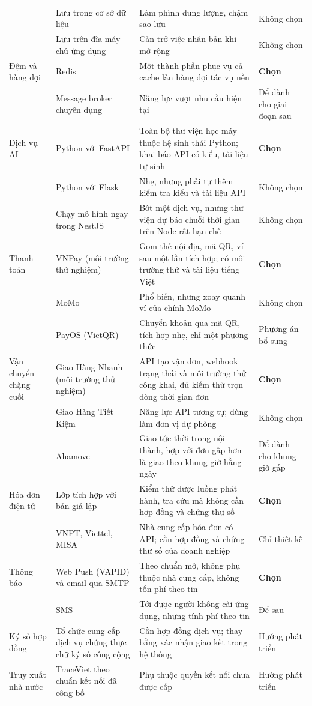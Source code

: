 \begin{longtable}{L{2.60cm} L{3.53cm} L{4.36cm} L{4.05cm}}
& Lưu trong cơ sở dữ liệu & Làm phình dung lượng, chậm sao lưu & Không chọn \\
& Lưu trên đĩa máy chủ ứng dụng & Cản trở việc nhân bản khi mở rộng & Không chọn \\
Đệm và hàng đợi & Redis & Một thành phần phục vụ cả cache lẫn hàng đợi tác vụ nền & \textbf{Chọn} \\
& Message broker chuyên dụng & Năng lực vượt nhu cầu hiện tại & Để dành cho giai đoạn sau \\
Dịch vụ AI & Python với FastAPI & Toàn bộ thư viện học máy thuộc hệ sinh thái Python; khai báo API có kiểu, tài liệu tự sinh & \textbf{Chọn} \\
& Python với Flask & Nhẹ, nhưng phải tự thêm kiểm tra kiểu và tài liệu API & Không chọn \\
& Chạy mô hình ngay trong NestJS & Bớt một dịch vụ, nhưng thư viện dự báo chuỗi thời gian trên Node rất hạn chế & Không chọn \\
Thanh toán & VNPay (môi trường thử nghiệm) & Gom thẻ nội địa, mã QR, ví sau một lần tích hợp; có môi trường thử và tài liệu tiếng Việt & \textbf{Chọn} \\
& MoMo & Phổ biến, nhưng xoay quanh ví của chính MoMo & Không chọn \\
& PayOS (VietQR) & Chuyển khoản qua mã QR, tích hợp nhẹ, chỉ một phương thức & Phương án bổ sung \\
Vận chuyển chặng cuối & Giao Hàng Nhanh (môi trường thử nghiệm) & API tạo vận đơn, webhook trạng thái và môi trường thử công khai, đủ kiểm thử trọn dòng thời gian đơn & \textbf{Chọn} \\
& Giao Hàng Tiết Kiệm & Năng lực API tương tự; dùng làm đơn vị dự phòng & Không chọn \\
& Ahamove & Giao tức thời trong nội thành, hợp với đơn gấp hơn là giao theo khung giờ hằng ngày & Để dành cho khung giờ gấp \\
Hóa đơn điện tử & Lớp tích hợp với bản giả lập & Kiểm thử được luồng phát hành, tra cứu mà không cần hợp đồng và chứng thư số & \textbf{Chọn} \\
& VNPT, Viettel, MISA & Nhà cung cấp hóa đơn có API; cần hợp đồng và chứng thư số của doanh nghiệp & Chỉ thiết kế \\
Thông báo & Web Push (VAPID) và email qua SMTP & Theo chuẩn mở, không phụ thuộc nhà cung cấp, không tốn phí theo tin & \textbf{Chọn} \\
& SMS & Tới được người không cài ứng dụng, nhưng tính phí theo tin & Để sau \\
Ký số hợp đồng & Tổ chức cung cấp dịch vụ chứng thực chữ ký số công cộng & Cần hợp đồng dịch vụ; thay bằng xác nhận giao kết trong hệ thống & Hướng phát triển \\
Truy xuất nhà nước & TraceViet theo chuẩn kết nối đã công bố & Phụ thuộc quyền kết nối chưa được cấp & Hướng phát triển \\
\end{longtable}
\endgroup

